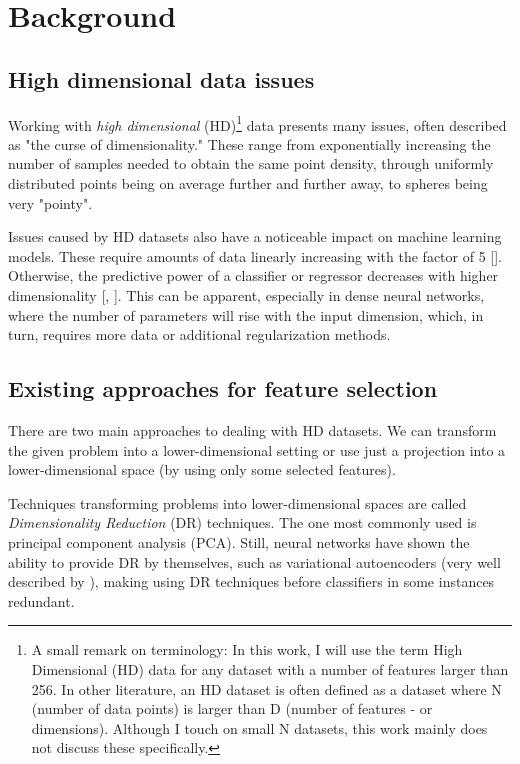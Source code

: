 \chapter{Background}

\section{High dimensional data issues}
Working with \textit{high dimensional} (HD)\footnote{A small remark on terminology: In this work, I will use the term High Dimensional (HD) data for any dataset with a number of features larger than 256. In other literature, an HD dataset is often defined as a dataset where N (number of data points) is larger than D (number of features - or dimensions). Although I touch on small N datasets, this work mainly does not discuss these specifically.} data presents many issues, often described as "the curse of dimensionality." These range from exponentially increasing the number of samples needed to obtain the same point density, through uniformly distributed points being on average further and further away, to spheres being very "pointy".

Issues caused by HD datasets also have a noticeable impact on machine learning models. These require amounts of data linearly increasing with the factor of 5 [\cite{Koutroumbas}]. Otherwise, the predictive power of a classifier or regressor decreases with higher dimensionality [\cite{McLachlan}, \cite{Trunk}]. This can be apparent, especially in dense neural networks, where the number of parameters will rise with the input dimension, which, in turn, requires more data or additional regularization methods.

\section{Existing approaches for feature selection}
There are two main approaches to dealing with HD datasets. We can transform the given problem into a lower-dimensional setting or use just a projection into a lower-dimensional space (by using only some selected features).

Techniques transforming problems into lower-dimensional spaces are called \textit{Dimensionality Reduction} (DR) techniques. The one most commonly used is principal component analysis (PCA). Still, neural networks have shown the ability to provide DR by themselves, such as variational autoencoders (very well described by \cite{vae}), making using DR techniques before classifiers in some instances redundant.

